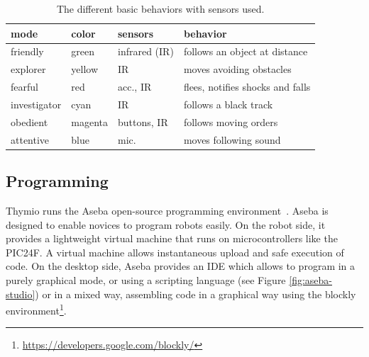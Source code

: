 \documentclass[letterpaper, 10 pt, conference]{ieeeconf}  %
\begin{document}
\begin{table}
\begin{tabularx}{\columnwidth}{@{}llll@{}}
\toprule
mode & color & sensors & behavior \\
\midrule
friendly & green & infrared (IR) & follows an object at distance \\
explorer & yellow & IR & moves avoiding obstacles \\
fearful & red & acc., IR & flees, notifies shocks and falls \\
investigator & cyan & IR & follows a black track \\
obedient & magenta & buttons, IR & follows moving orders \\
attentive & blue & mic. & moves following sound \\
\bottomrule
\end{tabularx}
\caption{The different basic behaviors with sensors used.}
\label{tbl:basic-behaviors}
\end{table}


\subsection{Programming}
\label{sec:aseba}

Thymio runs the Aseba open-source programming environment~\cite{aseba}.
Aseba is designed to enable novices to program robots easily.
On the robot side, it provides a lightweight virtual machine that runs on microcontrollers like the PIC24F.
A virtual machine allows instantaneous upload and safe execution of code.
On the desktop side, Aseba provides an IDE which allows to program in a purely graphical mode, or using a scripting language (see Figure \ref{fig:aseba-studio}) or in a mixed way, assembling code in a graphical way using the blockly environment\footnote{\url{https://developers.google.com/blockly/}}.

\end{document}
